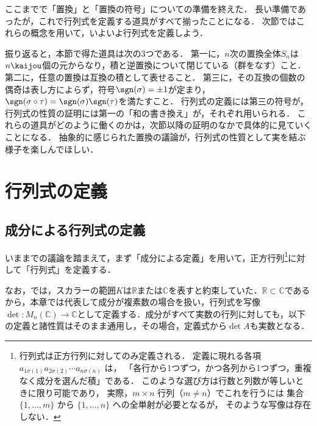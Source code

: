 ここまでで「置換」と「置換の符号」についての準備を終えた．
長い準備であったが，これで行列式を定義する道具がすべて揃ったことになる．
次節ではこれらの概念を用いて，いよいよ行列式を定義しよう．

振り返ると，本節で得た道具は次の$3$つである．
第一に，$n$次の置換全体$S_n$は$n\kaijou$個の元からなり，積と逆置換について閉じている（群をなす）こと．
第二に，任意の置換は互換の積として表せること．
第三に，その互換の個数の偶奇は表し方によらず，符号$\sgn(\sigma) = \pm 1$が定まり，$\sgn(\sigma \circ \tau) = \sgn(\sigma)\sgn(\tau)$を満たすこと．
行列式の定義には第三の符号が，行列式の性質の証明には第一の「和の書き換え」が，それぞれ用いられる．
これらの道具がどのように働くのかは，次節以降の証明のなかで具体的に見ていくことになる．
抽象的に感じられた置換の議論が，行列式の性質として実を結ぶ様子を楽しんでほしい．

\section{行列式の定義}

\subsection{成分による行列式の定義}

いままでの議論を踏まえて，まず「成分による定義」を用いて，正方行列\footnote{行列式は正方行列に対してのみ定義される．
定義に現れる各項 $a_{1\sigma(1)} a_{2\sigma(2)} \dotsm a_{n\sigma(n)}$ は，
「各行から1つずつ，かつ各列から1つずつ，重複なく成分を選んだ積」である．
このような選び方は行数と列数が等しいときに限り可能であり，
実際，$m \times n$ 行列（$m \ne n$）でこれを行うには
集合 $\{1, \dots, m\}$ から $\{1, \dots, n\}$ への全単射が必要となるが，
そのような写像は存在しない．}に対して「行列式」を定義する．

なお，では，スカラーの範囲$K$は$\mathbb{R}$または$\mathbb{C}$を表すと約束していた．$\mathbb{R} \subset \mathbb{C}$であるから，本章では代表して成分が複素数の場合を扱い，行列式を写像$\det \colon M_n(\mathbb{C}) \to \mathbb{C}$として定義する．成分がすべて実数の行列に対しても，以下の定義と諸性質はそのまま通用し，その場合，定義式から$\det A$も実数となる．


